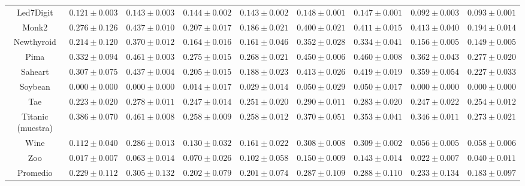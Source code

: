 \begin{landscape}
\begin{table}
{\begin{tabular}{|c|cccccccc|}
	Led7Digit & $0.121 \pm 0.003$ & $0.143 \pm 0.003$ & $0.144 \pm 0.002$ & $0.143 \pm 0.002$ & $0.148 \pm 0.001$ & $0.147 \pm 0.001$ & $0.092 \pm 0.003$ & $0.093 \pm 0.001$\\ 
	Monk2 & $0.276 \pm 0.126$ & $0.437 \pm 0.010$ & $0.207 \pm 0.017$ & $0.186 \pm 0.021$ & $0.400 \pm 0.021$ & $0.411 \pm 0.015$ & $0.413 \pm 0.040$ & $0.194 \pm 0.014$\\ 
	Newthyroid & $0.214 \pm 0.120$ & $0.370 \pm 0.012$ & $0.164 \pm 0.016$ & $0.161 \pm 0.046$ & $0.352 \pm 0.028$ & $0.334 \pm 0.041$ & $0.156 \pm 0.005$ & $0.149 \pm 0.005$\\ 
	Pima & $0.332 \pm 0.094$ & $0.461 \pm 0.003$ & $0.275 \pm 0.015$ & $0.268 \pm 0.021$ & $0.450 \pm 0.006$ & $0.460 \pm 0.008$ & $0.362 \pm 0.043$ & $0.277 \pm 0.020$\\ 
	Saheart & $0.307 \pm 0.075$ & $0.437 \pm 0.004$ & $0.205 \pm 0.015$ & $0.188 \pm 0.023$ & $0.413 \pm 0.026$ & $0.419 \pm 0.019$ & $0.359 \pm 0.054$ & $0.227 \pm 0.033$\\ 
	Soybean & $0.000 \pm 0.000$ & $0.000 \pm 0.000$ & $0.014 \pm 0.017$ & $0.029 \pm 0.014$ & $0.050 \pm 0.029$ & $0.050 \pm 0.017$ & $0.000 \pm 0.000$ & $0.000 \pm 0.000$\\ 
	Tae & $0.223 \pm 0.020$ & $0.278 \pm 0.011$ & $0.247 \pm 0.014$ & $0.251 \pm 0.020$ & $0.290 \pm 0.011$ & $0.283 \pm 0.020$ & $0.247 \pm 0.022$ & $0.254 \pm 0.012$\\ 
	Titanic (muestra) & $0.386 \pm 0.070$ & $0.461 \pm 0.008$ & $0.258 \pm 0.009$ & $0.258 \pm 0.012$ & $0.370 \pm 0.051$ & $0.353 \pm 0.041$ & $0.346 \pm 0.011$ & $0.273 \pm 0.021$\\ 
	Wine & $0.112 \pm 0.040$ & $0.286 \pm 0.013$ & $0.130 \pm 0.032$ & $0.161 \pm 0.022$ & $0.308 \pm 0.008$ & $0.309 \pm 0.002$ & $0.056 \pm 0.005$ & $0.058 \pm 0.006$\\ 
	Zoo & $0.017 \pm 0.007$ & $0.063 \pm 0.014$ & $0.070 \pm 0.026$ & $0.102 \pm 0.058$ & $0.150 \pm 0.009$ & $0.143 \pm 0.014$ & $0.022 \pm 0.007$ & $0.040 \pm 0.011$\\ 
	\hline
	Promedio & $0.229 \pm 0.112$ & $0.305 \pm 0.132$ & $0.202 \pm 0.079$ & $0.201 \pm 0.074$ & $0.287 \pm 0.109$ & $0.288 \pm 0.110$ & $0.233 \pm 0.134$ & $0.183 \pm 0.097$\\ 
	\hline
	\end{tabular}
}
\end{table}




\end{landscape}
